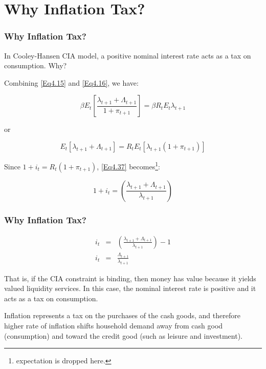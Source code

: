 \documentclass[handout]{beamer}
\begin{document}
\section{Why Inflation Tax?}

\begin{frame}
\frametitle{Why Inflation Tax?}\vskip 0.1in

In Cooley-Hansen CIA model, a positive nominal interest rate acts as
a tax on consumption. Why?\\\vskip 0.1in

Combining \eqref{Eq4.15} and \eqref{Eq4.16}, we have:

\begin{equation}\label{Eq4.37}
\beta E_{t} [\frac{\lambda_{t+1}+\Lambda_{t+1}}{1+\pi_{t+1}}] =
\beta R_{t}E_{t}\lambda_{t+1}
\end{equation}

or

\begin{equation}\label{Eq4.38}
E_{t} [\lambda_{t+1}+\Lambda_{t+1}] =
R_{t}E_{t}[\lambda_{t+1}(1+\pi_{t+1})]
\end{equation}

Since $1+i_{t} = R_{t}(1+\pi_{t+1})$, \eqref{Eq4.37}
becomes\footnote{expectation is dropped here.}:

\begin{equation}\label{Eq4.39}
1+i_{t} = (\frac{\lambda_{t+1}+\Lambda_{t+1}}{\lambda_{t+1}})
\end{equation}


\end{frame}

\begin{frame}
\frametitle{Why Inflation Tax?}\vskip 0.1in

\begin{eqnarray}
i_{t} &=& (\frac{\lambda_{t+1}+\Lambda_{t+1}}{\lambda_{t+1}})-1
\label{Eq4.40}\\
i_{t} &=& \frac{\Lambda_{t+1}}{\lambda_{t+1}} \label{Eq4.41}
\end{eqnarray}

That is, if the CIA constraint is binding, then money has value
because it yields valued liquidity services. In this case, the
nominal interest rate is positive and it acts as a tax on
consumption.\\\vskip 0.1in

Inflation represents a tax on the purchases of the cash goods, and
therefore higher rate of inflation shifts household demand away from
cash good (consumption) and toward the credit good (such as leisure
and investment).

\end{frame}
\end{document}
